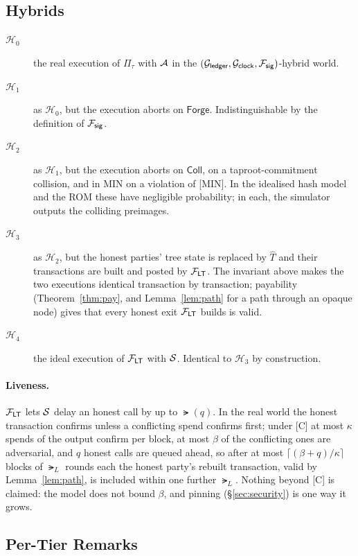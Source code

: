 \subsection{Hybrids}

\begin{description}
\item[$\mathcal{H}_0$] the real execution of $\Pi_\tau$ with $\mathcal{A}$ in
  the $(\mathcal{G}_{\mathsf{ledger}}, \mathcal{G}_{\mathsf{clock}}, \mathcal{F}_{\mathsf{sig}})$-hybrid world.
\item[$\mathcal{H}_1$] as $\mathcal{H}_0$, but the execution aborts on
  $\mathsf{Forge}$. Indistinguishable by the definition of $\mathcal{F}_{\mathsf{sig}}$.
\item[$\mathcal{H}_2$] as $\mathcal{H}_1$, but the execution aborts on
  $\mathsf{Coll}$, on a taproot-commitment collision, and in MIN on a
  violation of [MIN]. In the idealised hash model and the ROM these have
  negligible probability; in each, the simulator outputs the colliding
  preimages.
\item[$\mathcal{H}_3$] as $\mathcal{H}_2$, but the honest parties' tree
  state is replaced by $\hat T$ and their transactions are built and
  posted by $\mathcal{F}_{\mathsf{LT}}$. The invariant above makes the two executions
  identical transaction by transaction; payability
  (Theorem~\ref{thm:pay}, and Lemma~\ref{lem:path} for a path through an
  opaque node) gives that every honest exit $\mathcal{F}_{\mathsf{LT}}$ builds is valid.
\item[$\mathcal{H}_4$] the ideal execution of $\mathcal{F}_{\mathsf{LT}}$ with $\mathcal{S}$.
  Identical to $\mathcal{H}_3$ by construction.
\end{description}

\paragraph{Liveness.} $\mathcal{F}_{\mathsf{LT}}$ lets $\mathcal{S}$ delay an honest call by up to
$\lat(q)$. In the real world the honest transaction confirms unless a
conflicting spend confirms first; under [C] at most $\kappa$ spends of
the output confirm per block, at most $\beta$ of the conflicting ones are
adversarial, and $q$ honest calls are queued ahead, so after at most
$\lceil (\beta + q)/\kappa \rceil$ blocks of $\lat_L$ rounds each the
honest party's rebuilt transaction, valid by Lemma~\ref{lem:path}, is
included within one further $\lat_L$. Nothing beyond [C] is claimed: the
model does not bound $\beta$, and pinning (\S\ref{sec:security}) is one
way it grows.

\subsection{Per-Tier Remarks}

